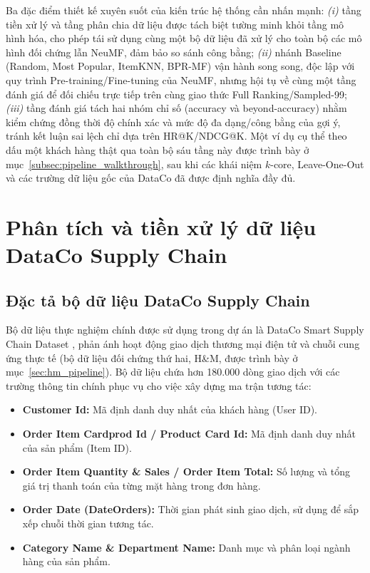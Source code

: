 Ba đặc điểm thiết kế xuyên suốt của kiến trúc hệ thống cần nhấn mạnh: \textit{(i)} tầng tiền xử lý và tầng phân chia dữ liệu được tách biệt tường minh khỏi tầng mô hình hóa, cho phép tái sử dụng cùng một bộ dữ liệu đã xử lý cho toàn bộ các mô hình đối chứng lẫn NeuMF, đảm bảo so sánh công bằng; \textit{(ii)} nhánh Baseline (Random, Most Popular, ItemKNN, BPR-MF) vận hành song song, độc lập với quy trình Pre-training/Fine-tuning của NeuMF, nhưng hội tụ về cùng một tầng đánh giá để đối chiếu trực tiếp trên cùng giao thức Full Ranking/Sampled-99; \textit{(iii)} tầng đánh giá tách hai nhóm chỉ số (accuracy và beyond-accuracy) nhằm kiểm chứng đồng thời độ chính xác và mức độ đa dạng/công bằng của gợi ý, tránh kết luận sai lệch chỉ dựa trên HR@K/NDCG@K. Một ví dụ cụ thể theo dấu một khách hàng thật qua toàn bộ sáu tầng này được trình bày ở mục~\ref{subsec:pipeline_walkthrough}, sau khi các khái niệm $k$-core, Leave-One-Out và các trường dữ liệu gốc của DataCo đã được định nghĩa đầy đủ.

\section{Phân tích và tiền xử lý dữ liệu DataCo Supply Chain}
\label{sec:dataco_pipeline}

\subsection{Đặc tả bộ dữ liệu DataCo Supply Chain}
\label{subsec:dataco_description}

Bộ dữ liệu thực nghiệm chính được sử dụng trong dự án là DataCo Smart Supply Chain Dataset \parencite{dataco2019}, phản ánh hoạt động giao dịch thương mại điện tử và chuỗi cung ứng thực tế (bộ dữ liệu đối chứng thứ hai, H\&M, được trình bày ở mục~\ref{sec:hm_pipeline}). Bộ dữ liệu chứa hơn 180.000 dòng giao dịch với các trường thông tin chính phục vụ cho việc xây dựng ma trận tương tác:
\begin{itemize}
    \item \textbf{Customer Id:} Mã định danh duy nhất của khách hàng (User ID).
    \item \textbf{Order Item Cardprod Id / Product Card Id:} Mã định danh duy nhất của sản phẩm (Item ID).
    \item \textbf{Order Item Quantity \& Sales / Order Item Total:} Số lượng và tổng giá trị thanh toán của từng mặt hàng trong đơn hàng.
    \item \textbf{Order Date (DateOrders):} Thời gian phát sinh giao dịch, sử dụng để sắp xếp chuỗi thời gian tương tác.
    \item \textbf{Category Name \& Department Name:} Danh mục và phân loại ngành hàng của sản phẩm.
\end{itemize}

